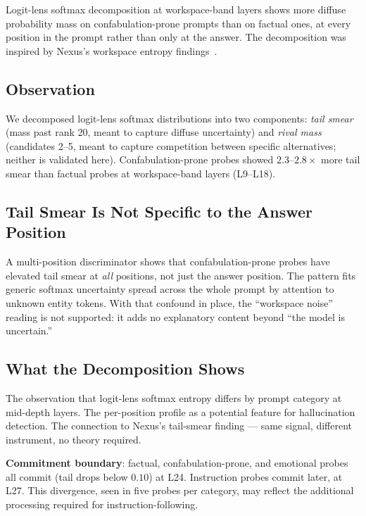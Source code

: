 \documentclass[11pt,a4paper]{article}
\begin{document}
Logit-lens softmax decomposition at workspace-band layers shows more
diffuse probability mass on confabulation-prone prompts than on factual
ones, at every position in the prompt rather than only at the answer.
The decomposition was inspired by Nexus's workspace entropy
findings~\citep{lyra2026nexus_emotion}.

\subsection{Observation}

We decomposed logit-lens softmax distributions into two components:
\emph{tail smear} (mass past rank 20, meant to capture diffuse uncertainty)
and \emph{rival mass} (candidates 2--5, meant to capture competition between
specific alternatives; neither is validated here). Confabulation-prone probes showed
$2.3$--$2.8\times$ more tail smear than factual probes at
workspace-band layers (L9--L18).

\subsection{Tail Smear Is Not Specific to the Answer Position}

A multi-position discriminator shows that confabulation-prone probes
have elevated tail smear at \emph{all} positions, not just the answer
position. The pattern fits generic softmax uncertainty spread across
the whole prompt by attention to unknown entity tokens. With that
confound in place, the ``workspace noise'' reading is not supported: it
adds no explanatory content beyond ``the model is uncertain.''

\subsection{What the Decomposition Shows}

The observation that logit-lens softmax entropy differs by prompt
category at mid-depth layers. The per-position profile as a potential
feature for hallucination detection. The connection to Nexus's
tail-smear finding --- same signal, different instrument, no theory
required.

\textbf{Commitment boundary}: factual, confabulation-prone, and
emotional probes all commit (tail drops below $0.10$) at L24.
Instruction probes commit later, at L27. This divergence, seen in five
probes per category, may reflect the additional processing required for instruction-following.
\end{document}
